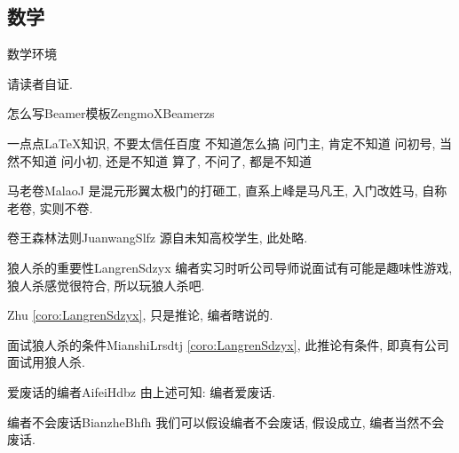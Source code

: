\documentclass[hyperref,UTF8,11pt,CJK]{beamer}
\begin{document}
\subsection{数学}
\begin{frame}{数学环境}
	\begin{scuproof}{}
		请读者自证.
	\end{scuproof}
	\begin{scualgorithm}{怎么写Beamer模板}{ZengmoXBeamerzs}
		\begin{algorithmic}[1]
		\REQUIRE 一点点\LaTeX 知识, 不要太信任百度
		\ENSURE 不知道怎么搞
		\STATE 问门主, 肯定不知道
		\STATE 问初号, 当然不知道
		\STATE 问小初, 还是不知道
		\RETURN 算了, 不问了, 都是不知道
		\end{algorithmic}
	\end{scualgorithm}
	\begin{scudefinition}{马老卷}{MalaoJ}
		是混元形翼太极门的打砸工, 直系上峰是马凡王, 入门改姓马, 自称老卷, 实则不卷.
	\end{scudefinition}
	\begin{sculemma}{卷王森林法则}{JuanwangSlfz}
		源自未知高校学生, 此处略.
	\end{sculemma}
	\begin{scucorollary}{狼人杀的重要性}{LangrenSdzyx}
		编者实习时听公司导师说面试有可能是趣味性游戏, 狼人杀感觉很符合, 所以玩狼人杀吧.
	\end{scucorollary}
	\begin{scuremark}{}{Zhu}
		\vref{coro:LangrenSdzyx}, 只是推论, 编者瞎说的.
	\end{scuremark}
	\begin{scucondition}{面试狼人杀的条件}{MianshiLrsdtj}
		\vref{coro:LangrenSdzyx}, 此推论有条件, 即真有公司面试用狼人杀.
	\end{scucondition}
	\begin{scuconclusion}{爱废话的编者}{AifeiHdbz}
		由上述可知: 编者爱废话.
	\end{scuconclusion}
	\begin{scuassumption}{编者不会废话}{BianzheBhfh}
		我们可以假设编者不会废话, 假设成立, 编者当然不会废话.
	\end{scuassumption}
\end{frame}
\end{document}
